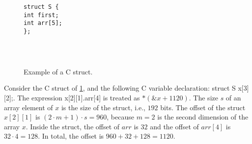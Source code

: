 \begin{figure}
    \begin{centering}
        \begin{verbatim}
struct S {
int first;
int arr[5];
};
    \end{verbatim}
        \caption{Example of a C struct.}\label{fig:struct}\
    \end{centering}
\end{figure}

\begin{example}
    Consider the C struct of \cref{fig:struct}, and the following C variable declaration: \textsf{struct S x[3][2];}.
    The expression \textsf{x[2][1].arr[4]} is treated as $*(\&x + 1120)$.
    The size $s$ of an array element of $x$ is the size of the struct, i.e., $192$ bits.
    The offset of the struct $x[2][1]$ is $(2 \cdot m + 1) \cdot s = 960$, because $m = 2$ is the second dimension of the array $x$.
    Inside the struct, the offset of $arr$ is $32$ and the offset of $arr[4]$ is $32\cdot 4 = 128$.
    In total, the offset is $960 + 32 + 128 = 1120$.
\end{example}
